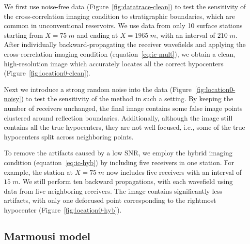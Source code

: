 
We first use noise-free data (Figure~\ref{fig:datatrace-clean}) to test the sensitivity of the cross-correlation imaging condition to stratigraphic boundaries, which are common in unconventional reservoirs. We use data from only 10 surface stations starting from $X=75\;m$ and ending at $X=1965\;m$, with an interval of $210\;m$. After individually backward-propagating the receiver wavefields and applying the cross-correlation imaging condition (equation~\ref{eq:ic-mult}), we obtain a clean, high-resolution image which accurately locates all the correct hypocenters (Figure~\ref{fig:location0-clean}).

Next we introduce a strong random noise into the data (Figure~\ref{fig:location0-noisy}) to test the sensitivity of the method in such a setting. By keeping the number of receivers unchanged, the final image contains some false image points clustered around reflection boundaries. Additionally, although the image still contains all the true hypocenters, they are not well focused, i.e., some of the true hypocenters split across neighboring points.

To remove the artifacts caused by a low SNR, we employ the hybrid imaging condition (equation~\ref{eq:ic-hyb}) by including five receivers in one station. For example, the station at $X=75\;m$ now includes five receivers with an interval of $15\;m$. We still perform ten backward propagations, with each wavefield using data from five neighboring receivers. The image contains significantly less artifacts, with only one defocused point corresponding to the rightmost hypocenter (Figure~\ref{fig:location0-hyb}).


\subsection{Marmousi model}

